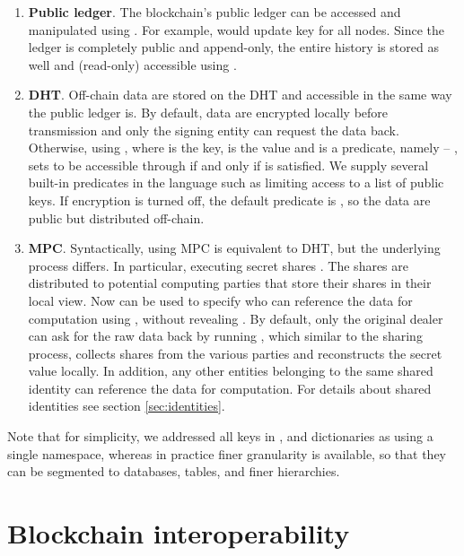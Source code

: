 \documentclass{article} \usepackage{nips13submit_e,times}
\begin{document}
\begin{enumerate}
	\item \textbf{Public ledger}. The blockchain's public ledger can be accessed and manipulated using . For example,  would update key  for all nodes. Since the ledger is completely public and append-only, the entire history is stored as well and (read-only) accessible using .
	
	\item \textbf{DHT}. Off-chain data are stored on the DHT and accessible in the same way the public ledger is. By default, data are encrypted locally before transmission and only the signing entity can request the data back. Otherwise, using , where  is the key,  is the value and  is a predicate, namely -- , sets  to be accessible through  if and only if  is satisfied. We supply several built-in predicates in the language such as limiting access to a list of public keys. If encryption is turned off, the default predicate is , so the data are public but distributed off-chain.
	
	\item \textbf{MPC}. Syntactically, using MPC is equivalent to DHT, but the underlying process differs. In particular, executing  secret shares . The shares are distributed to potential computing parties that store their shares in their local view. Now  can be used to specify who can reference the data for computation using , without revealing . By default, only the original dealer can ask for the raw data back by running , which similar to the sharing process, collects shares from the various parties and reconstructs the secret value locally. In addition, any other entities belonging to the same shared identity can reference the data for computation. For details about shared identities see section \ref{sec:identities}.
\end{enumerate}

Note that for simplicity, we addressed all keys in ,  and  dictionaries as using a single namespace, whereas in practice finer granularity is available, so that they can be segmented to databases, tables, and finer hierarchies. 










\section{Blockchain interoperability}
\end{document}
